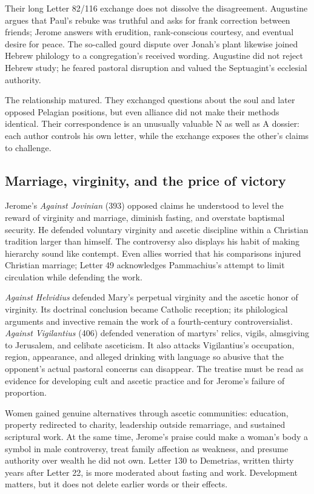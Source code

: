 Their long Letter 82/116 exchange does not dissolve the disagreement. Augustine
argues that Paul's rebuke was truthful and asks for frank correction between
friends; Jerome answers with erudition, rank-conscious courtesy, and eventual
desire for peace. The so-called gourd dispute over Jonah's plant likewise
joined Hebrew philology to a congregation's received wording. Augustine did
not reject Hebrew study; he feared pastoral disruption and valued the
Septuagint's ecclesial authority.

The relationship matured. They exchanged questions about the soul and later
opposed Pelagian positions, but even alliance did not make their methods
identical. Their correspondence is an unusually valuable N as well as A
dossier: each author controls his own letter, while the exchange exposes the
other's claims to challenge.

\subsection{Marriage, virginity, and the price of victory}

Jerome's \emph{Against Jovinian} (393) opposed claims he understood to level
the reward of virginity and marriage, diminish fasting, and overstate baptismal
security. He defended voluntary virginity and ascetic discipline within a
Christian tradition larger than himself. The controversy also displays his
habit of making hierarchy sound like contempt. Even allies worried that his
comparisons injured Christian marriage; Letter 49 acknowledges Pammachius's
attempt to limit circulation while defending the work.

\emph{Against Helvidius} defended Mary's perpetual virginity and the ascetic
honor of virginity. Its doctrinal conclusion became Catholic reception; its
philological arguments and invective remain the work of a fourth-century
controversialist. \emph{Against Vigilantius} (406) defended veneration of
martyrs' relics, vigils, almsgiving to Jerusalem, and celibate asceticism. It
also attacks Vigilantius's occupation, region, appearance, and alleged drinking
with language so abusive that the opponent's actual pastoral concerns can
disappear. The treatise must be read as evidence for developing cult and
ascetic practice and for Jerome's failure of proportion.

Women gained genuine alternatives through ascetic communities: education,
property redirected to charity, leadership outside remarriage, and sustained
scriptural work. At the same time, Jerome's praise could make a woman's body a
symbol in male controversy, treat family affection as weakness, and presume
authority over wealth he did not own. Letter 130 to Demetrias, written thirty
years after Letter 22, is more moderated about fasting and work. Development
matters, but it does not delete earlier words or their effects.

